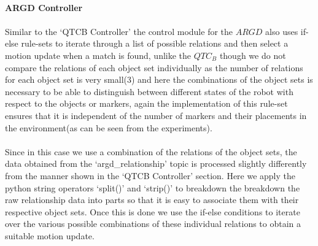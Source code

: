 \paragraph{ARGD Controller}
\paragraph{} Similar to the `QTCB Controller' the control module for the $ARGD$ also uses if-else rule-sets to iterate through a list of possible relations and then select a motion update when a match is found, unlike the $QTC_B$ though we do not compare the relations of each object set individually as the number of relations for each object set is very small(3) and here the combinations of the object sets is necessary to be able to distinguish between different states of the robot with respect to the objects or markers, again the implementation of this rule-set ensures that it is independent of the number of markers and their placements in the environment(as can be seen from the experiments).
\paragraph{}Since in this case we use a combination of the relations of the object sets, the data obtained from the `argd\_relationship' topic is processed slightly differently from the manner shown in the `QTCB Controller' section. Here we apply the python string operators `split()' and `strip()' to breakdown the breakdown the raw relationship data into parts so that it is easy to associate them with their respective object sets. Once this is done we use the if-else conditions to iterate over the various possible combinations of these individual relations to obtain a suitable motion update. 

